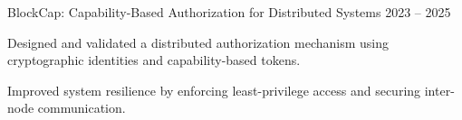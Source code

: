 \begin{cventries}
  \cventry
    {BlockCap: Capability-Based Authorization for Distributed Systems}
    {2023 -- 2025}
    {
      \begin{cvitems}
        \item {Designed and validated a distributed authorization mechanism using cryptographic identities and capability-based tokens.}
        \item {Improved system resilience by enforcing least-privilege access and securing inter-node communication.}
      \end{cvitems}
    }

\end{cventries}

\vspace{4mm}




